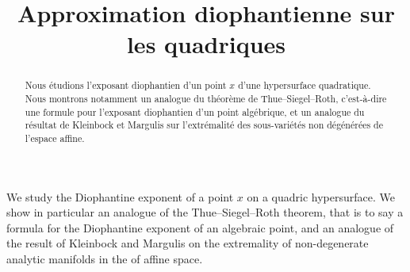\graphicspath{{./figures/}}

\newcommand*{\mk}{\mkern -1mu}
\newcommand*{\Mk}{\mkern -2mu}
\newcommand*{\mK}{\mkern 1mu}
\newcommand*{\MK}{\mkern 2mu}

\hypersetup{urlcolor=purple, linkcolor=blue, citecolor=red}

\newcommand*{\romanenumi}{\renewcommand*{\theenumi}{\roman{enumi}}}
\newcommand*{\Romanenumi}{\renewcommand*{\theenumi}{\Roman{enumi}}}
\newcommand*{\alphenumi}{\renewcommand*{\theenumi}{\alph{enumi}}}
\newcommand*{\Alphenumi}{\renewcommand*{\theenumi}{\Alph{enumi}}}
\let\oldhat\hat
\renewcommand*{\hat}[1]{\mathchoice{\widehat{#1}}{\widehat{#1}}{\oldhat{#1}}{\oldhat{#1}}}
\let\oldexists\exists
\renewcommand*{\exists}{\mathrel{\oldexists}}
\let\oldforall\forall
\renewcommand*{\forall}{\mathrel{\oldforall}}

\title{Approximation diophantienne sur les quadriques}



\author[\initial{N.} \lastname{de Saxcé}]{ }
\address{CNRS -- Université Sorbonne Paris Nord\\
LAGA / UMR 7539\\
99 avenue Jean-Baptiste Clément,\\
93430 Villetaneuse (France)}


\begin{abstract}
Nous étudions l'exposant diophantien d'un point $x$ d'une hypersurface quadratique. Nous montrons notamment un analogue du théorème de Thue--Siegel--Roth, c'est-à-dire une formule pour l'exposant diophantien d'un point algébrique, et un analogue du résultat de Kleinbock et Margulis sur l'extrémalité des sous-variétés non dégénérées de l'espace affine.
\end{abstract}

\begin{altabstract}
We study the Diophantine exponent of a point $x$ on a quadric hypersurface. We show in particular an analogue of the Thue--Siegel--Roth theorem, that is to say a formula for the Diophantine exponent of an algebraic point, and an analogue of the result of Kleinbock and Margulis on the extremality of non-degenerate analytic manifolds in the of affine space.
\end{altabstract}




